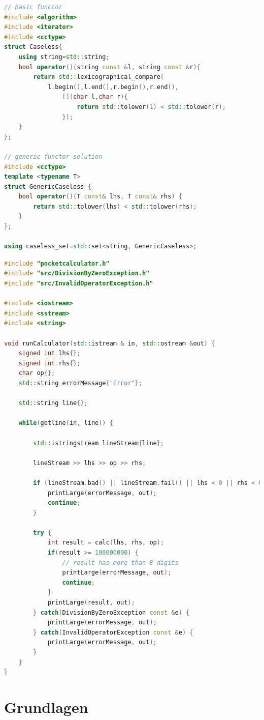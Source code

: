 \begin{lstlisting}[language=C++, caption=Einener Comparator]
// basic functor
#include <algorithm>
#include <iterator>
#include <cctype> 
struct Caseless{
	using string=std::string;
	bool operator()(string const &l, string const &r){
		return std::lexicographical_compare(
			l.begin(),l.end(),r.begin(),r.end(),
				[](char l,char r){
					return std::tolower(l) < std::tolower(r);
				});
	}
};

// generic functor solution
#include <cctype> 
template <typename T> 
struct GenericCaseless { 
	bool operator()(T const& lhs, T const& rhs) { 
		return std::tolower(lhs) < std::tolower(rhs); 
	} 
}; 

using caseless_set=std::set<string, GenericCaseless>;
\end{lstlisting}

\clearpage

\begin{lstlisting}[language=C++]
#include "pocketcalculator.h"
#include "src/DivisionByZeroException.h"
#include "src/InvalidOperatorException.h"

#include <iostream>
#include <sstream>
#include <string>

void runCalculator(std::istream & in, std::ostream &out) {
	signed int lhs{};
	signed int rhs{};
	char op{};
	std::string errorMessage{"Error"};
	
	std::string line{};
	
	while(getline(in, line)) {
		
		std::istringstream lineStream{line};
		
		lineStream >> lhs >> op >> rhs;
			
		if (lineStream.bad() || lineStream.fail() || lhs < 0 || rhs < 0) {
			printLarge(errorMessage, out);
			continue;
		}
		
		try {
			int result = calc(lhs, rhs, op);
			if(result >= 100000000) {
				// result has more than 8 digits
				printLarge(errorMessage, out);
				continue;
			}
			printLarge(result, out);
		} catch(DivisionByZeroException const &e) {
			printLarge(errorMessage, out);
		} catch(InvalidOperatorException const &e) {
			printLarge(errorMessage, out);
		}
	}
}
\end{lstlisting}


\section{Grundlagen}
